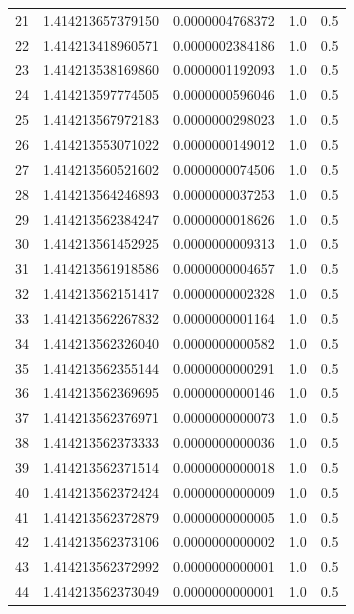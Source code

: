 \documentclass[titlepage,a4paper]{article}
\begin{document}
\begin{center}
\begin{tabular}{| c | l | c | c | c |}
    21      & 1.414213657379150  &  0.0000004768372  &  1.0  &  0.5 \\
    22      & 1.414213418960571  &  0.0000002384186  &  1.0  &  0.5 \\
    23      & 1.414213538169860  &  0.0000001192093  &  1.0  &  0.5 \\
    24      & 1.414213597774505  &  0.0000000596046  &  1.0  &  0.5 \\
    25      & 1.414213567972183  &  0.0000000298023  &  1.0  &  0.5 \\
    26      & 1.414213553071022  &  0.0000000149012  &  1.0  &  0.5 \\
    27      & 1.414213560521602  &  0.0000000074506  &  1.0  &  0.5 \\
    28      & 1.414213564246893  &  0.0000000037253  &  1.0  &  0.5 \\
    29      & 1.414213562384247  &  0.0000000018626  &  1.0  &  0.5 \\
    30      & 1.414213561452925  &  0.0000000009313  &  1.0  &  0.5 \\
    31      & 1.414213561918586  &  0.0000000004657  &  1.0  &  0.5 \\
    32      & 1.414213562151417  &  0.0000000002328  &  1.0  &  0.5 \\
    33      & 1.414213562267832  &  0.0000000001164  &  1.0  &  0.5 \\
    34      & 1.414213562326040  &  0.0000000000582  &  1.0  &  0.5 \\
    35      & 1.414213562355144  &  0.0000000000291  &  1.0  &  0.5 \\
    36      & 1.414213562369695  &  0.0000000000146  &  1.0  &  0.5 \\
    37      & 1.414213562376971  &  0.0000000000073  &  1.0  &  0.5 \\
    38      & 1.414213562373333  &  0.0000000000036  &  1.0  &  0.5 \\
    39      & 1.414213562371514  &  0.0000000000018  &  1.0  &  0.5 \\
    40      & 1.414213562372424  &  0.0000000000009  &  1.0  &  0.5 \\
    41      & 1.414213562372879  &  0.0000000000005  &  1.0  &  0.5 \\
    42      & 1.414213562373106  &  0.0000000000002  &  1.0  &  0.5 \\
    43      & 1.414213562372992  &  0.0000000000001  &  1.0  &  0.5 \\
    44      & 1.414213562373049  &  0.0000000000001  &  1.0  &  0.5 \\
    
    \hline
    \end{tabular}
\end{center}
\clearpage
\end{document}
